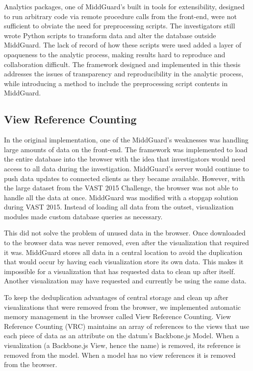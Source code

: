 \documentclass[midd]{thesis}
\begin{document}
Analytics packages, one of MiddGuard's built in tools for extensibility,
designed to run arbitrary code via remote procedure calls from the front-end,
were not sufficient to obviate the need for preprocessing scripts. The
investigators still wrote Python scripts to transform data and alter the
database outside MiddGuard. The lack of record of how these scripts were used
added a layer of opaqueness to the analytic process, making results hard to
reproduce and collaboration difficult. The framework designed and implemented in
this thesis addresses the issues of transparency and reproducibility in the
analytic process, while introducing a method to include the preprocessing script
contents in MiddGuard.

\subsection{View Reference Counting}

In the original implementation, one of the MiddGuard's weaknesses was handling
large amounts of data on the front-end. The framework was implemented to load
the entire database into the browser with the idea that investigators would need
access to all data during the investigation. MiddGuard's server would continue
to push data updates to connected clients as they became available. However,
with the large dataset from the VAST 2015 Challenge, the browser was not able to
handle all the data at once. MiddGuard was modified with a stopgap solution
during VAST 2015. Instead of loading all data from the outset, visualization
modules made custom database queries as necessary.

This did not solve the problem of unused data in the browser. Once downloaded to
the browser data was never removed, even after the visualization that required
it was. MiddGuard stores all data in a central location to avoid the duplication
that would occur by having each visualization store its own data. This makes it
impossible for a visualization that has requested data to clean up after itself.
Another visualization may have requested and currently be using the same data.

To keep the deduplication advantages of central storage and clean up after
visualizations that were removed from the browser, we implemented automatic
memory management in the browser called View Reference Counting. View Reference
Counting (VRC) maintains an array of references to the views that use each piece
of data as an attribute on the datum's Backbone.js Model. When a visualization
(a Backbone.js View, hence the name) is removed, its reference is removed from
the model. When a model has no view references it is removed from the browser.
\end{document}
